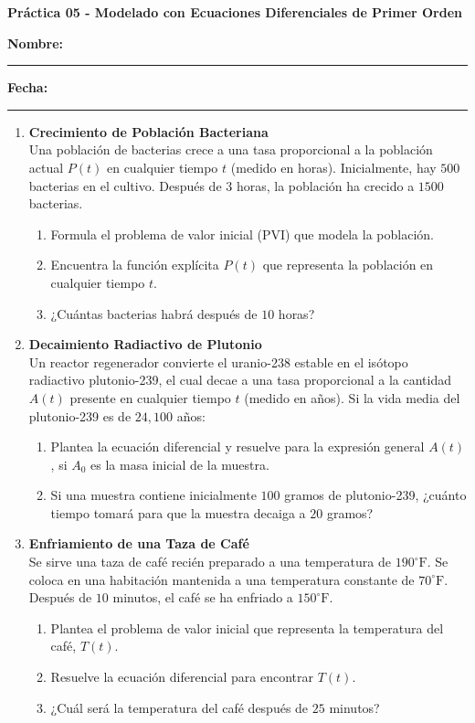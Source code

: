 \documentclass[a4paper,11pt]{article}
\begin{document}
\begin{center}
    \Large\textbf{Práctica 05 - Modelado con Ecuaciones Diferenciales de Primer Orden}\\[0.5cm]  

\end{center}
  \textbf{Nombre:} \rule{9cm}{0.4pt}  \textbf{Fecha:} \rule{4.5cm}{0.4pt}


\begin{enumerate}[itemsep=0.4cm, label=\textbf{\arabic*.}]
    \item \textbf{Crecimiento de Población Bacteriana} \\
    Una población de bacterias crece a una tasa proporcional a la población actual $P(t)$ en cualquier tiempo $t$ (medido en horas). Inicialmente, hay $500$ bacterias en el cultivo. Después de $3$ horas, la población ha crecido a $1500$ bacterias.
    \begin{enumerate}[label=(\alph*), itemsep=0.1cm]
        \item Formula el problema de valor inicial (PVI) que modela la población.
        \item Encuentra la función explícita $P(t)$ que representa la población en cualquier tiempo $t$.
        \item ¿Cuántas bacterias habrá después de $10$ horas?
    \end{enumerate}

    \item \textbf{Decaimiento Radiactivo de Plutonio} \\
    Un reactor regenerador convierte el uranio-238 estable en el isótopo radiactivo plutonio-239, el cual decae a una tasa proporcional a la cantidad $A(t)$ presente en cualquier tiempo $t$ (medido en años). Si la vida media del plutonio-239 es de $24,100$ años:
    \begin{enumerate}[label=(\alph*), itemsep=0.1cm]
        \item Plantea la ecuación diferencial y resuelve para la expresión general $A(t)$, si $A_0$ es la masa inicial de la muestra.
        \item Si una muestra contiene inicialmente $100$ gramos de plutonio-239, ¿cuánto tiempo tomará para que la muestra decaiga a $20$ gramos?
    \end{enumerate}

    \item \textbf{Enfriamiento de una Taza de Café} \\
    Se sirve una taza de café recién preparado a una temperatura de $190^\circ\text{F}$. Se coloca en una habitación mantenida a una temperatura constante de $70^\circ\text{F}$. Después de $10$ minutos, el café se ha enfriado a $150^\circ\text{F}$.
    \begin{enumerate}[label=(\alph*), itemsep=0.1cm]
        \item Plantea el problema de valor inicial que representa la temperatura del café, $T(t)$.
        \item Resuelve la ecuación diferencial para encontrar $T(t)$.
        \item ¿Cuál será la temperatura del café después de $25$ minutos?
    \end{enumerate}


\end{enumerate}
\end{document}
